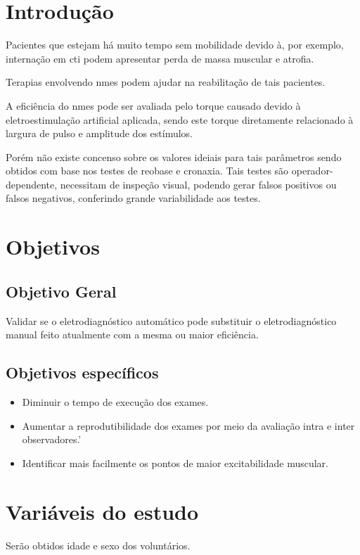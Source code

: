 \documentclass[a4paper,10pt]{article}
\title{}
\author{}
\date{}
\begin{document}
\maketitle

\section{Introdução}

Pacientes que estejam há muito tempo sem mobilidade devido à, por exemplo, internação em \ac{cti} podem apresentar perda de massa muscular e atrofia.

Terapias envolvendo \ac{nmes} podem ajudar na reabilitação de tais pacientes.

A eficiência do \ac{nmes} pode ser avaliada pelo torque causado devido à eletroestimulação artificial aplicada, sendo este torque diretamente relacionado à largura de pulso e amplitude dos estímulos.

Porém não existe concenso sobre os valores ideiais para tais parâmetros sendo obtidos com base nos testes de reobase e cronaxia. Tais testes são operador-dependente, necessitam de inspeção visual, podendo gerar falsos positivos ou falsos negativos, conferindo grande variabilidade aos testes.

\section{Objetivos}

\subsection{Objetivo Geral}
Validar se o eletrodiagnóstico automático pode substituir o eletrodiagnóstico manual feito atualmente com a mesma ou maior eficiência.
\subsection{Objetivos específicos}
\begin{itemize}
  \item Diminuir o tempo de execução dos exames.
  \item Aumentar a reprodutibilidade dos exames por meio da avaliação intra e inter observadores.’
  \item Identificar mais facilmente os pontos de maior excitabilidade muscular.
\end{itemize}

\section{Variáveis do estudo}
Serão obtidos idade e sexo dos voluntários.
\end{document}
